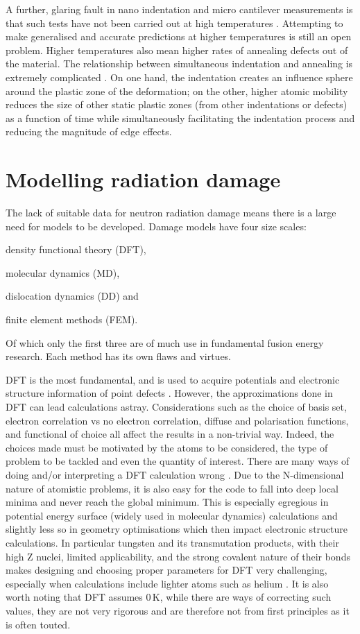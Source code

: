 \documentclass[12pt, a4paper]{article}
\begin{document}
		A further, glaring fault in nano indentation and micro cantilever measurements is that such tests have not been carried out at high temperatures \cite{cant}. Attempting to make generalised and accurate predictions at higher temperatures is still an open problem. Higher temperatures also mean higher rates of annealing defects out of the material. The relationship between simultaneous indentation and annealing is extremely complicated \cite{hotnanoindent}. On one hand, the indentation creates an influence sphere around the plastic zone of the deformation; on the other, higher atomic mobility reduces the size of other static plastic zones (from other indentations or defects) as a function of time while simultaneously facilitating the indentation process and reducing the magnitude of edge effects.
	\section{Modelling radiation damage}
		The lack of suitable data for neutron radiation damage means there is a large need for models to be developed. Damage models have four size scales: 
		\begin{inparaenum}
			 \item density functional theory (DFT), 
			 \item molecular dynamics (MD),
			 \item dislocation dynamics (DD) and
			 \item finite element methods (FEM).
		\end{inparaenum} 
		Of which only the first three are of much use in fundamental fusion energy research. Each method has its own flaws and virtues.
		
		DFT is the most fundamental, and is used to acquire potentials and electronic structure information of point defects \cite{dftwhe}. However, the approximations done in DFT can lead calculations astray. Considerations such as the choice of basis set, electron correlation vs no electron correlation, diffuse and polarisation functions, and functional of choice all affect the results in a non-trivial way. Indeed, the choices made must be motivated by the atoms to be considered, the type of problem to be tackled and even the quantity of interest. There are many ways of doing and/or interpreting a DFT calculation wrong \cite{dftintro}. Due to the N-dimensional nature of atomistic problems, it is also easy for the code to fall into deep local minima and never reach the global minimum. This is especially egregious in potential energy surface (widely used in molecular dynamics) calculations \cite{pescalc} and slightly less so in geometry optimisations which then impact electronic structure calculations. In particular tungsten and its transmutation products, with their high Z nuclei, limited applicability, and the strong covalent nature of their bonds makes designing and choosing proper parameters for DFT very challenging, especially when calculations include lighter atoms such as helium \cite{3rdrowbasis}. It is also worth noting that DFT assumes $0\,\textrm{K}$, while there are ways of correcting such values, they are not very rigorous and are therefore not from first principles as it is often touted.
		
\end{document}
